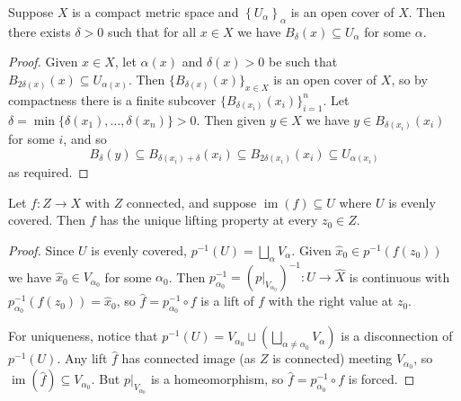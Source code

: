\documentclass[a4paper]{scrartcl}
\begin{document}
\begin{lemma} \label{lem:lebesgue}
	Suppose $X$ is a compact metric space and $\left\{U_\alpha\right\}_\alpha$ is an open cover of $X$. Then there exists $\delta>0$ such that for all $x \in X$ we have $B_\delta(x) \subseteq U_\alpha$ for some $\alpha$.
\end{lemma}
\begin{proof}
	Given $x \in X$, let $\alpha(x)$ and $\delta(x)>0$ be such that $B_{2 \delta(x)}(x) \subseteq U_{\alpha(x)}$. Then $\{B_{\delta(x)}(x)\}_{x \in X}$ is an open cover of $X$, so by compactness there is a finite subcover $\{B_{\delta(x_i)}(x_i)\}_{i=1}^n$. Let $\delta=\min \{\delta(x_1), \ldots, \delta(x_n)\}>0$. Then given $y \in X$ we have $y \in B_{\delta(x_i)}(x_i)$ for some $i$, and so
	$$
	B_\delta(y) \subseteq B_{\delta(x_i) + \delta}(x_i) \subseteq B_{2 \delta(x_i)}(x_i) \subseteq U_{\alpha(x_i)}
	$$
	as required.
\end{proof}

\begin{lemma} \label{lem:lift-small}
	Let $f: Z \to X$ with $Z$ connected, and suppose $\operatorname{im}(f) \subseteq U$ where $U$ is evenly covered. Then $f$ has the unique lifting property at every $z_0 \in Z$.
\end{lemma}
\begin{proof}
	Since $U$ is evenly covered, $p^{-1}(U)=\bigsqcup_\alpha V_\alpha$. Given $\hat x_0 \in p^{-1}(f(z_0))$ we have $\hat{x}_0 \in V_{\alpha_0}$ for some $\alpha_0$. Then $p_{\alpha_0}^{-1} = (p|_{V_{\alpha_0}})^{-1}: U \rightarrow \hat{X}$ is continuous with $p_{\alpha_0}^{-1}(f(z_0))=\hat{x}_0$, so $\hat{f}=p_{\alpha_0}^{-1} \circ f$ is a lift of $f$ with the right value at $z_0$.

	For uniqueness, notice that $p^{-1}(U)=V_{\alpha_0} \sqcup(\bigsqcup_{\alpha \neq \alpha_0} V_\alpha)$ is a disconnection of $p^{-1}(U)$. Any lift $\hat f$ has connected image (as $Z$ is connected) meeting $V_{\alpha_0}$, so $\operatorname{im}(\hat{f}) \subseteq V_{\alpha_0}$. But $p|_{V_{\alpha_0}}$ is a homeomorphism, so $\hat f = p_{\alpha_0}^{-1} \circ f$ is forced.
\end{proof}
\end{document}
